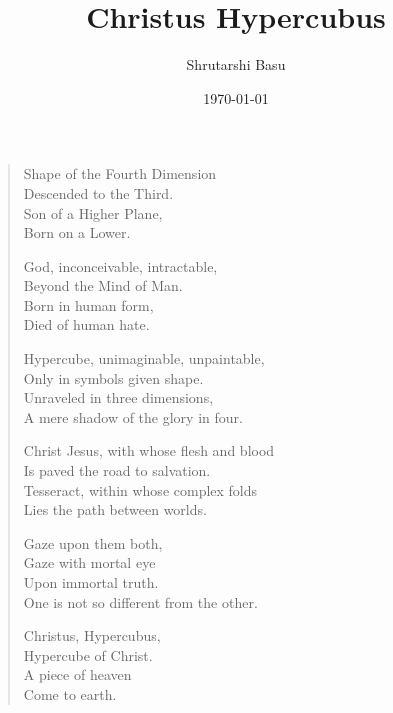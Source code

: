 \documentclass[11pt,letterpaper]{article}
\title{Christus Hypercubus}
\author{Shrutarshi Basu}
\date{\today}
\begin{document}
\maketitle

\begin{verse}
Shape of the Fourth Dimension\\
\hspace{3em}Descended to the Third.\\
Son of a Higher Plane,\\
\hspace{3em}Born on a Lower.

\begin{center}
God, inconceivable, intractable,\\
Beyond the Mind of Man.\\
Born in human form,\\
Died of human hate.
\end{center}


\begin{flushright}
Hypercube, unimaginable, unpaintable,\\ 
Only in symbols given shape.\\ 
Unraveled in three dimensions,\\ 
A mere shadow of the glory in four.
\end{flushright}

\begin{flushright}
Christ Jesus, with whose flesh and blood\\
Is paved the road to salvation.\\
Tesseract, within whose complex folds\\
Lies the path between worlds.
\end{flushright}

\begin{center}
Gaze upon them both,\\
Gaze with mortal eye\\
Upon immortal truth.\\
One is not so different from the other.
\end{center}

Christus, Hypercubus,\\
\hspace{3em}Hypercube of Christ.\\
A piece of heaven\\
\hspace{3em}Come to earth.

\end{verse}

\end{document}
